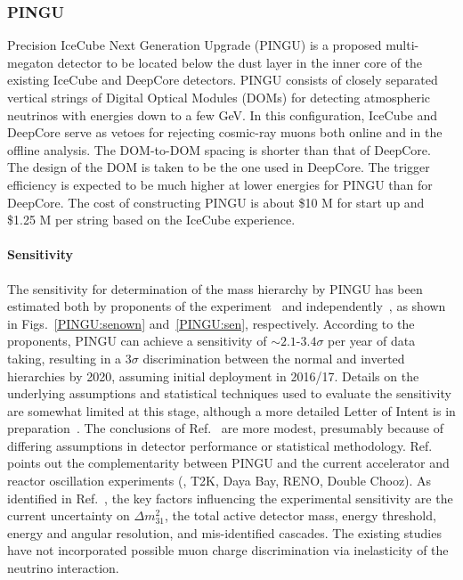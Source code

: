 \subsubsection{PINGU}

Precision IceCube Next Generation Upgrade (PINGU) is a proposed
multi-megaton detector to be located below the dust layer in the inner
core of the existing IceCube and DeepCore detectors.  PINGU consists
of closely separated vertical strings of Digital Optical Modules
(DOMs) for detecting atmospheric neutrinos with energies down to a few
GeV.  In this configuration, IceCube and DeepCore serve as vetoes for
rejecting cosmic-ray muons both online and in the offline analysis.  The
DOM-to-DOM spacing is shorter than that of DeepCore.  The design
of the DOM is taken to be the one used in DeepCore.  The trigger
efficiency is expected to be much higher at lower energies for PINGU
than for DeepCore. 
The cost of constructing PINGU is about \$10 M for start up and \$1.25 M per string based on the 
IceCube experience.

\paragraph{Sensitivity}\label{atm:PINGUsen}

The sensitivity
for determination of the mass hierarchy by PINGU has been
estimated both by proponents of the experiment~\cite{atm:pingu} and
independently~\cite{atm:Winter}, as shown in Figs.~\ref{PINGU:senown} and~\ref{PINGU:sen}, respectively.  
According to
the proponents, PINGU can achieve a sensitivity of $\sim 2.1$-$ 3.4 \sigma$ per year of data taking, resulting in a $3 \sigma$ 
discrimination between the normal and inverted hierarchies 
 by 2020, assuming initial deployment in 2016/17.  
 Details on the underlying assumptions and statistical techniques used to evaluate the sensitivity are somewhat limited at this stage, although a more detailed  Letter of Intent is in preparation~\cite{atm:pc}.  
The conclusions of Ref.~\cite{atm:Winter} are more modest, presumably because of differing assumptions in detector performance or statistical methodology.  Ref.~\cite{atm:Winter} points
out the complementarity between PINGU and the current accelerator and
reactor oscillation experiments (\NOvA, T2K, Daya Bay, RENO, Double
Chooz). 
As identified in Ref.~\cite{atm:Winter}, the key factors
influencing the experimental sensitivity are the current uncertainty
on $\Delta m^2_{31}$, the total active detector mass, energy
threshold, energy and 
angular resolution, and mis-identified cascades.  The existing studies
have not incorporated possible muon charge discrimination via
inelasticity of the neutrino interaction. %

